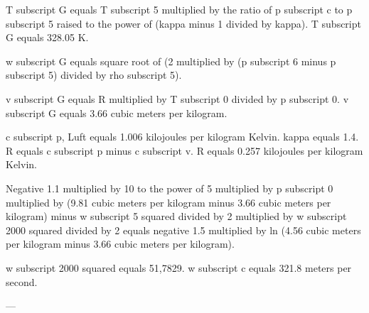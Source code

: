 T subscript G equals T subscript 5 multiplied by the ratio of p subscript c to p subscript 5 raised to the power of (kappa minus 1 divided by kappa).  
T subscript G equals 328.05 K.  

w subscript G equals square root of (2 multiplied by (p subscript 6 minus p subscript 5) divided by rho subscript 5).  

v subscript G equals R multiplied by T subscript 0 divided by p subscript 0.  
v subscript G equals 3.66 cubic meters per kilogram.  

c subscript p, Luft equals 1.006 kilojoules per kilogram Kelvin.  
kappa equals 1.4.  
R equals c subscript p minus c subscript v.  
R equals 0.257 kilojoules per kilogram Kelvin.  

Negative 1.1 multiplied by 10 to the power of 5 multiplied by p subscript 0 multiplied by (9.81 cubic meters per kilogram minus 3.66 cubic meters per kilogram) minus w subscript 5 squared divided by 2 multiplied by w subscript 2000 squared divided by 2 equals negative 1.5 multiplied by ln (4.56 cubic meters per kilogram minus 3.66 cubic meters per kilogram).  

w subscript 2000 squared equals 51,7829.  
w subscript c equals 321.8 meters per second.  

---